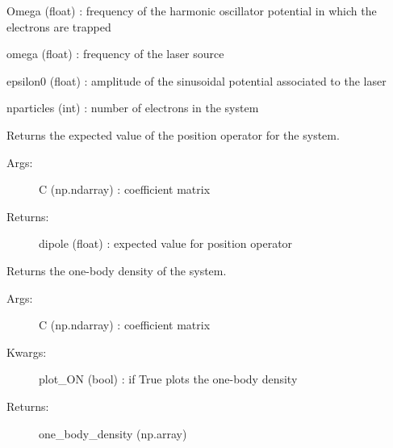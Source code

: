 \documentclass[letterpaper,10pt,english]{sphinxmanual}
\begin{document}
\begin{fulllineitems}
\begin{description}
Omega (float) : frequency of the harmonic oscillator potential in which the electrons are trapped

omega (float) : frequency of the laser source

epsilon0 (float) : amplitude of the sinusoidal potential associated to the laser

nparticles (int) : number of electrons in the system

\end{description}

\begin{fulllineitems}
\label{\detokenize{index:do.GHF.eval_dipole}}
Returns the expected value of the position operator for the system.
\begin{description}
\item[{Args:}] \leavevmode
C (np.ndarray) : coefficient matrix

\item[{Returns:            }] \leavevmode
dipole (float) : expected value for position operator

\end{description}

\end{fulllineitems}


\begin{fulllineitems}
\label{\detokenize{index:do.GHF.eval_one_body_density}}
Returns the one-body density of the system.
\begin{description}
\item[{Args:}] \leavevmode
C (np.ndarray) : coefficient matrix

\item[{Kwargs:}] \leavevmode
plot\_ON (bool) : if True plots the one-body density

\item[{Returns:}] \leavevmode
one\_body\_density (np.array)

\end{description}

\end{fulllineitems}


\end{fulllineitems}
\end{document}
